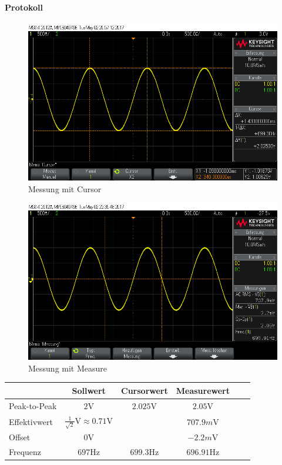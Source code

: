 \documentclass[10pt]{scrreprt}
\begin{document}
        \paragraph{Protokoll}
        \begin{center}
            \begin{figure}[H]
                \includegraphics[width=\textwidth]{Screenshot_GUI_4112_cursor.png}
              \caption{Messung mit Cursor}
            \end{figure}
            \begin{figure}[H]
                \includegraphics[width=\textwidth]{Screenshot_GUI_4112_Werte.png}
              \caption{Messung mit Measure}
            \end{figure}
            \begin{tabular}{lccccc}
                \toprule
                 & Sollwert & Cursorwert & Measurewert\\
                \midrule
                Peak-to-Peak & $2\si{\volt}$ & $2.025\si{\volt}$ & $2.05\si{\volt}$\\
                Effektivwert & $\frac{1}{\sqrt{2}}\si{\volt} \approx 0.71\si{\volt}$ &  & $707.9\si{m\volt}$\\
                Offset & $0\si{\volt}$ &  & $-2.2\si{m\volt}$\\
                Frequenz & $697\si{\hertz}$ & $699.3\si{\hertz}$ & $696.91\si{\hertz}$ \\
                \bottomrule
            \end{tabular}
        \end{center}
\end{document}
